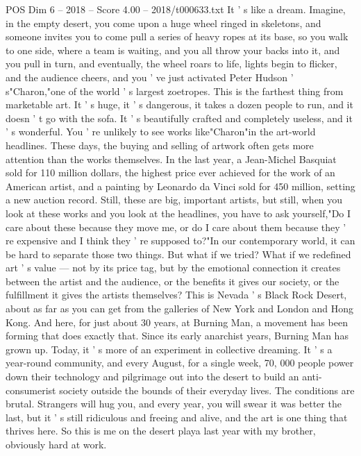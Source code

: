 \begin{textsample}{POS Dim 6 – 2018 – Score 4.00 – 2018/t000633.txt}  \label{ex:f6_pos_061}
It ' s like a dream.
Imagine, in the empty desert, you come upon a huge wheel ringed in skeletons, and someone invites you to come pull a series of heavy ropes at its base, so you walk to one side, where a team is waiting, and you all throw your backs into it, and you pull in turn, and eventually, the wheel roars to life, lights begin to flicker, and the audience cheers, and you ' ve just activated Peter Hudson ' s"Charon,"one of the world ' s largest zoetropes.
This is the farthest thing from marketable art.
It ' s huge, it ' s dangerous, it takes a dozen people to run, and it doesn ' t go with the sofa.
It ' s beautifully crafted and completely useless, and it ' s wonderful.
You ' re unlikely to see works like"Charon"in the art-world headlines.
These days, the buying and selling of artwork often gets more attention than the works themselves.
In the last year, a Jean-Michel Basquiat sold for 110 million dollars, the highest price ever achieved for the work of an American artist, and a painting by Leonardo da Vinci sold for 450 million, setting a new auction record.
Still, these are big, important artists, but still, when you look at these works and you look at the headlines, you have to ask yourself,"Do I care about these because they move me, or do I care about them because they ' re expensive and I think they ' re supposed to?"In our contemporary world, it can be hard to separate those two things.
But what if we tried?
What if we redefined art ' s value — not by its price tag, but by the emotional connection it creates between the artist and the audience, or the benefits it gives our society, or the fulfillment it gives the artists themselves?
This is Nevada ' s Black Rock Desert, about as far as you can get from the galleries of New York and London and Hong Kong.
And here, for just about 30 years, at Burning Man, a movement has been forming that does exactly that.
Since its early anarchist years, Burning Man has grown up.
Today, it ' s more of an experiment in collective dreaming.
It ' s a year-round community, and every August, for a single week, 70, 000 people power down their technology and pilgrimage out into the desert to build an anti-consumerist society outside the bounds of their everyday lives.
The conditions are brutal.
Strangers will hug you, and every year, you will swear it was better the last, but it ' s still ridiculous and freeing and alive, and the art is one thing that thrives here.
So this is me on the desert playa last year with my brother, obviously hard at work.

\end{textsample}
